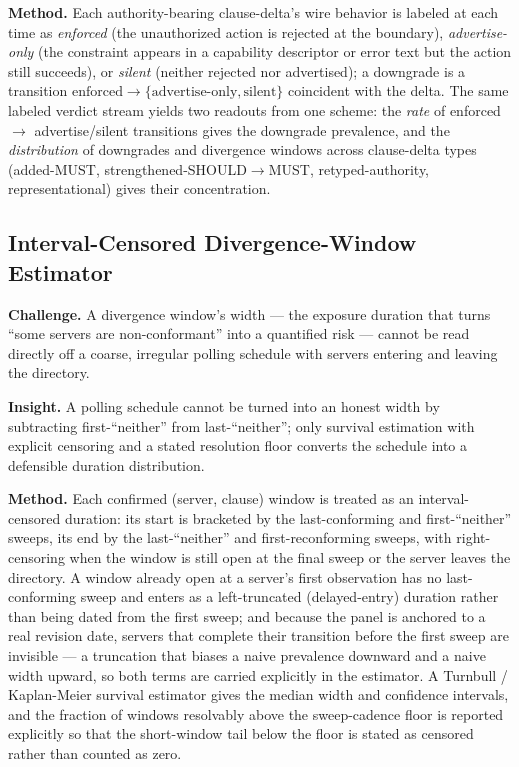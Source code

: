 \documentclass[11pt]{article}
\begin{document}
\textbf{Method.} Each authority-bearing clause-delta's wire behavior is labeled at each time as \emph{enforced} (the unauthorized action is rejected at the boundary), \emph{advertise-only} (the constraint appears in a capability descriptor or error text but the action still succeeds), or \emph{silent} (neither rejected nor advertised); a downgrade is a transition $\text{enforced} \to \{\text{advertise-only}, \text{silent}\}$ coincident with the delta. The same labeled verdict stream yields two readouts from one scheme: the \emph{rate} of enforced $\to$ advertise/silent transitions gives the downgrade prevalence, and the \emph{distribution} of downgrades and divergence windows across clause-delta types (added-MUST, strengthened-SHOULD$\to$MUST, retyped-authority, representational) gives their concentration.

\subsection{Interval-Censored Divergence-Window Estimator}

\textbf{Challenge.} A divergence window's width --- the exposure duration that turns ``some servers are non-conformant'' into a quantified risk --- cannot be read directly off a coarse, irregular polling schedule with servers entering and leaving the directory.

\textbf{Insight.} A polling schedule cannot be turned into an honest width by subtracting first-``neither'' from last-``neither''; only survival estimation with explicit censoring and a stated resolution floor converts the schedule into a defensible duration distribution.

\textbf{Method.} Each confirmed (server, clause) window is treated as an interval-censored duration: its start is bracketed by the last-conforming and first-``neither'' sweeps, its end by the last-``neither'' and first-reconforming sweeps, with right-censoring when the window is still open at the final sweep or the server leaves the directory. A window already open at a server's first observation has no last-conforming sweep and enters as a left-truncated (delayed-entry) duration rather than being dated from the first sweep; and because the panel is anchored to a real revision date, servers that complete their transition before the first sweep are invisible --- a truncation that biases a naive prevalence downward and a naive width upward, so both terms are carried explicitly in the estimator. A Turnbull / Kaplan-Meier survival estimator \citep{kaplanmeier1958, turnbull1976} gives the median width and confidence intervals, and the fraction of windows resolvably above the sweep-cadence floor is reported explicitly so that the short-window tail below the floor is stated as censored rather than counted as zero.
\end{document}
